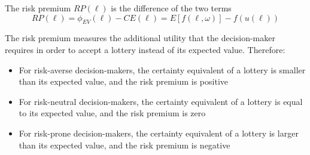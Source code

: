 The risk premium $RP(\ell)$ is the difference of the two terms
$$ RP(\ell) = \phi_{EV} (\ell) - CE(\ell) = E\left[f(\ell, \omega)\right] - f(u(\ell)) $$

The risk premium measures the additional utility that the decision-maker requires in order to accept a lottery instead of its expected value. Therefore: 
\begin{itemize}
	\item For risk-averse decision-makers, the certainty equivalent of a lottery is smaller than its expected value, and the risk premium is positive
	
	\item For risk-neutral decision-makers, the certainty equivalent of a lottery is equal to its expected value, and the risk premium is zero 
	
	\item For risk-prone decision-makers, the certainty equivalent of a lottery is larger than its expected value, and the risk premium is negative
\end{itemize}

